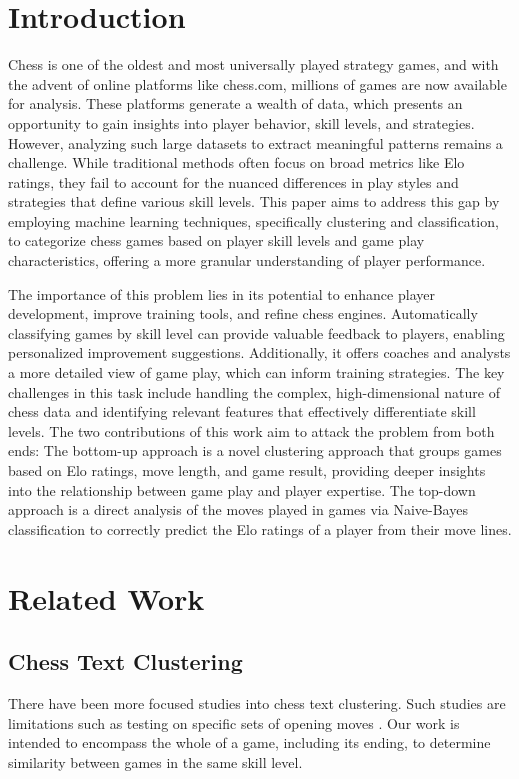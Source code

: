 \documentclass[conference]{IEEEtran}
\begin{document}
\section{Introduction}
Chess is one of the oldest and most universally played strategy games, and with the advent of online platforms like chess.com, millions of games are now available for analysis. These platforms generate a wealth of data, which presents an opportunity to gain insights into player behavior, skill levels, and strategies. However, analyzing such large datasets to extract meaningful patterns remains a challenge. While traditional methods often focus on broad metrics like Elo ratings, they fail to account for the nuanced differences in play styles and strategies that define various skill levels. This paper aims to address this gap by employing machine learning techniques, specifically clustering and classification, to categorize chess games based on player skill levels and game play characteristics, offering a more granular understanding of player performance.

The importance of this problem lies in its potential to enhance player development, improve training tools, and refine chess engines. Automatically classifying games by skill level can provide valuable feedback to players, enabling personalized improvement suggestions. Additionally, it offers coaches and analysts a more detailed view of game play, which can inform training strategies. The key challenges in this task include handling the complex, high-dimensional nature of chess data and identifying relevant features that effectively differentiate skill levels. The two contributions of this work aim to attack the problem from both ends: The bottom-up approach is a novel clustering approach that groups games based on Elo ratings, move length, and game result, providing deeper insights into the relationship between game play and player expertise. The top-down approach is a direct analysis of the moves played in games via Naive-Bayes classification to correctly predict the Elo ratings of a player from their move lines.

\section{Related Work}
\subsection{Chess Text Clustering}
There have been more focused studies into chess text clustering. Such studies are  limitations such as testing on specific sets of opening moves \cite{b1}\cite{b2}. Our work is intended to encompass the whole of a game, including its ending, to determine similarity between games in the same skill level.
\end{document}
